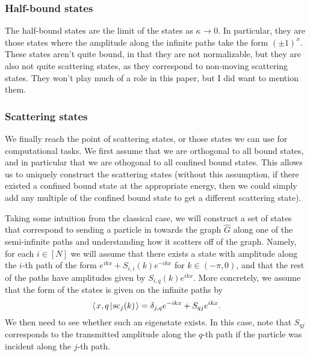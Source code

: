 \documentclass[../thesis-main/thesis-main]{subfiles}
\begin{document}

\subsubsection{Half-bound states}

The half-bound states are the limit of the states as $\kappa \rightarrow 0$.  In particular, they are those states where the amplitude along the infinite paths take the form $(\pm 1)^x$.  These states aren't quite bound, in that they are not normalizable, but they are also not quite scattering states, as they correspond to non-moving scattering states.  They won't play much of a role in this paper, but I did want to mention them.

\subsubsection{Scattering states}

We finally reach the point of scattering states, or those states we can use for computational tasks.  We first assume that we are orthogonal to all bound states, and in particular that we are othogonal to all confined bound states.  This allows us to uniquely construct the scattering states (without this assumption, if there existed a confined bound state at the appropriate energy, then we could simply add any multiple of the confined bound state to get a different scattering state).

Taking some intuition from the classical case, we will construct a set of states that correspond to sending a particle in towards the graph $\widehat{G}$ along one of the semi-infinite paths and understanding how it scatters off of the graph.  Namely, for each $i\in[N]$ we will assume that there exists a state with amplitude along the $i$-th path of the form $e^{i k x} + S_{i,i}(k)e^{-i k x}$ for $k\in (-\pi, 0)$, and that the rest of the paths have amplitudes given by $S_{i,q}(k)e^{ikx}$.  More concretely, we assume that the form of the states is given on the infinite paths by
\begin{equation}
  \langle\mspace{2mu} x,q \mspace{2mu} | \mspace{2mu} \text{sc}_{j}(k)\mspace{2mu} \rangle = \delta_{j,q} e^{-i k x} + S_{qj} e^{i k x}.
\end{equation}
We then need to see whether such an eigenstate exists.  In this case, note that $S_{qj}$ corresponds to the transmitted amplitude along the $q$-th path if the particle was incident along the $j$-th path.
\end{document}
